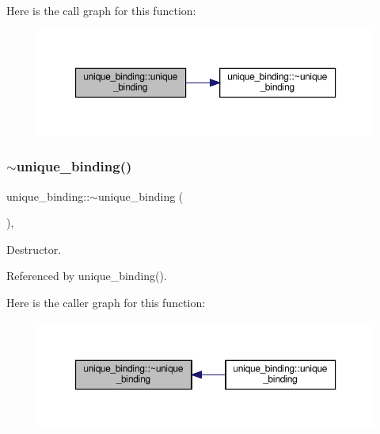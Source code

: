 Here is the call graph for this function\+:
\nopagebreak
\begin{figure}[H]
\begin{center}
\leavevmode
\includegraphics[width=350pt]{d4/d52/classunique__binding_ad92c3d681deec507f2a2da257b39a496_cgraph}
\end{center}
\end{figure}
\mbox{\label{classunique__binding_a3fa8502710094f30f0770e5843b9bb25}} 
\subsubsection{\texorpdfstring{$\sim$unique\+\_\+binding()}{~unique\_binding()}}
{\footnotesize\ttfamily unique\+\_\+binding\+::$\sim$unique\+\_\+binding (\begin{DoxyParamCaption}{ }\end{DoxyParamCaption})\hspace{0.3cm}{\ttfamily [override]}, {\ttfamily [default]}}



Destructor. 



Referenced by unique\+\_\+binding().

Here is the caller graph for this function\+:
\nopagebreak
\begin{figure}[H]
\begin{center}
\leavevmode
\includegraphics[width=350pt]{d4/d52/classunique__binding_a3fa8502710094f30f0770e5843b9bb25_icgraph}
\end{center}
\end{figure}


